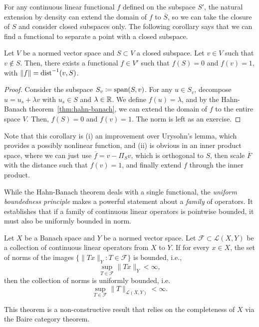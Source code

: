 For any continuous linear functional $f$ defined on the subspace $S'$, the natural extension by density can extend the domain of $f$ to $\overline{S}$, so we can take the closure of $S$ and consider closed subspaces only. The following corollary says that we can find a functional to separate a point with a closed subspace. 
\begin{corollary}\label{cor:hahn-banach-extension}
    Let $V$ be a normed vector space and $S\subset V$ a closed subspace. Let $v\in V$ such that $v\notin S$. Then, there exists a functional $f\in V'$ such that $f(S)=0$ and $f(v)=1$, with $\|f\| = \operatorname{\text{dist}}^{-1}(v, S)$.
    \begin{proof}
        Consider the subspace $S_v \coloneqq \operatorname{\text{span}}(S,v)$. For any $u\in S_v$, decompose $u=u_s+\lambda v$ with $u_s\in S$ and $\lambda\in \mathbb{R}$. We define $f(u)=\lambda$, and by the Hahn-Banach theorem~\ref{thm:hahn-banach}, we can extend the domain of $f$ to the entire space $V$. Then, $f(S)=0$ and $f(v)=1$. The norm is left as an exercise. 
    \end{proof}
\end{corollary}
Note that this corollary is (i) an improvement over Urysohn's lemma, which provides a possibly nonlinear function, and (ii) is obvious in an inner product space, where we can just use $\overline{f} = v - \Pi_S v$, which is orthogonal to $S$, then scale $\overline{F}$ with the distance such that $f(v)=1$, and finally extend $f$ through the inner product. 

While the Hahn-Banach theorem deals with a single functional, the \emph{uniform boundedness principle} makes a powerful statement about a \emph{family} of operators. It establishes that if a family of continuous linear operators is pointwise bounded, it must also be uniformly bounded in norm.
\begin{theorem}\label{thm:banach-steinhaus}
    Let $X$ be a Banach space and $Y$ be a normed vector space. Let $\mathcal{F}\subset \mathcal{L}(X,Y)$ be a collection of continuous linear operators from $X$ to $Y$. If for every $x \in X$, the set of norms of the images $\{ \|Tx\|_Y : T \in \mathcal{F} \}$ is bounded, i.e.,
    \begin{equation*}
        \sup_{T \in \mathcal{F}} \|Tx\|_Y < \infty,
    \end{equation*}
    then the collection of norms is uniformly bounded, i.e.
    \begin{equation}
        \sup_{T \in \mathcal{F}} \|T\|_{\mathcal{L}(X,Y)} < \infty.
    \end{equation}
\end{theorem}
This theorem is a non-constructive result that relies on the completeness of $X$ via the Baire category theorem.

